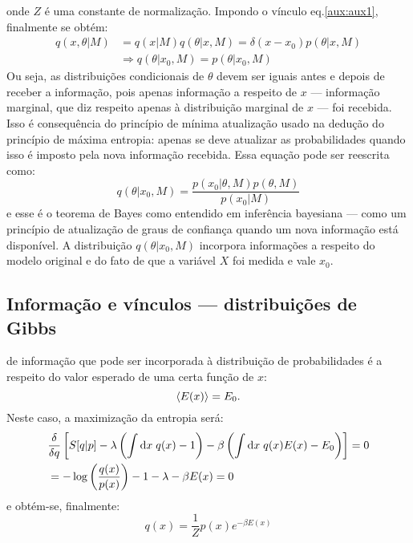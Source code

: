 onde $Z$ é uma constante de normalização. Impondo o vínculo eq.\eqref{aux:aux1}, finalmente se obtém:
\begin{align*}
 q(x,\theta|M) &= q(x|M)q(\theta|x, M) =  \delta(x-x_0) p(\theta|x, M) \\ &\Rightarrow q(\theta|x_0, M) = p(\theta|x_0, M)
\end{align*}
Ou seja, as distribuições condicionais de $\theta$ devem ser iguais antes e depois de receber a informação, pois apenas informação a respeito de $x$ --- informação marginal, que diz respeito apenas à distribuição marginal de $x$ --- foi recebida. Isso é consequência do princípio de mínima atualização usado na dedução do princípio de máxima entropia: apenas se deve atualizar as probabilidades quando isso é imposto pela nova informação recebida. Essa equação pode ser reescrita como:
\begin{equation}
 q(\theta | x_0, M) = \dfrac{p(x_0 | \theta, M)p(\theta, M)}{p(x_0 |M)}
\end{equation}
e esse é o teorema de Bayes como entendido em inferência bayesiana --- como um princípio de atualização de graus de confiança quando um nova informação está disponível. A distribuição $q(\theta | x_0, M)$ incorpora informações a respeito do modelo original e do fato de que a variável $X$ foi medida e vale $x_0$. 

\subsection{Informação e vínculos --- distribuições de Gibbs}
 de informação que pode ser incorporada à distribuição de probabilidades é a respeito do valor esperado de uma certa função de $x$:
\[
 \left\langle E(x) \right\rangle = E_0.
\]
Neste caso, a maximização da entropia será:
\begin{align*}
  &\frac{\delta}{\delta q} \left[S[q | p] - \lambda \left(\int \mathrm{d} x\; q(x) -1 \right) - \beta\left(\int\mathrm{d} x\; q(x) E(x) - E_0\right)\right] =0\\
  &= - \log\left(\frac{q(x)}{p(x)}\right) - 1 - \lambda -\beta E(x) = 0
\end{align*}
e obtém-se, finalmente:
\begin{equation}
\label{eq:gibbs}
 q(x) = \dfrac{1}{Z}p(x) e^{-\beta E(x)}
\end{equation}

